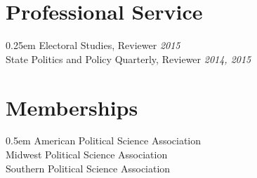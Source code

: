 \documentclass[article,11pt,oneside]{memoir}
\begin{document}
\bigskip{}

\section{Professional Service}{0.25em}
Electoral Studies, Reviewer \hfill \emph{2015}\\
State Politics and Policy Quarterly, Reviewer \hfill \emph{2014, 2015} \\

\section{Memberships}{0.5em}
American Political Science Association \\
Midwest Political Science Association \\
Southern Political Science Association \\
\end{document}
